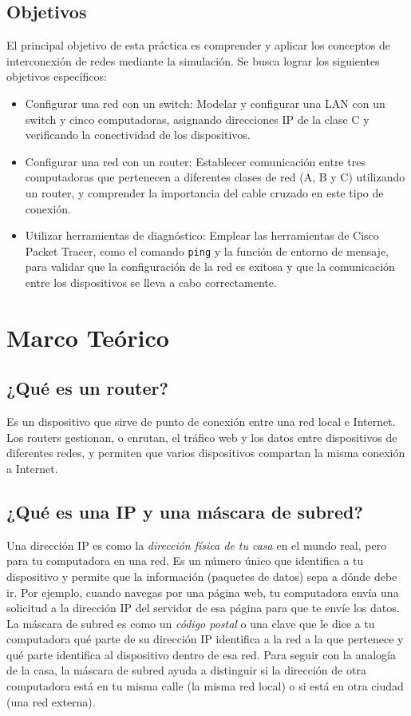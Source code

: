 \documentclass[letterpaper,12pt,oneside]{article}
\begin{document}
\subsection*{Objetivos}
El principal objetivo de esta práctica es comprender y aplicar los conceptos de interconexión de redes mediante la simulación. Se busca lograr los siguientes objetivos específicos:
\begin{itemize}
    \item Configurar una red con un switch: Modelar y configurar una LAN con un switch y cinco computadoras, asignando direcciones IP de la clase C y verificando la conectividad de los dispositivos.
    \item Configurar una red con un router: Establecer comunicación entre tres computadoras que pertenecen a diferentes clases de red (A, B y C) utilizando un router, y comprender la importancia del cable cruzado en este tipo de conexión.
    \item Utilizar herramientas de diagnóstico: Emplear las herramientas de Cisco Packet Tracer, como el comando \texttt{ping} y la función de entorno de mensaje, para validar que la configuración de la red es exitosa y que la comunicación entre los dispositivos se lleva a cabo correctamente.
\end{itemize}
\clearpage

\section{Marco Teórico}
\subsection*{¿Qué es un router?}
Es un dispositivo que sirve de punto de conexión entre una red local e Internet. Los routers gestionan, o enrutan, el tráfico web y los datos entre dispositivos de diferentes redes, y permiten que varios dispositivos compartan la misma conexión a Internet.

\subsection*{¿Qué es una IP y una máscara de subred?}
Una dirección IP es como la \textit{dirección física de tu casa} en el mundo real, pero para tu computadora en una red. Es un número único que identifica a tu dispositivo y permite que la información (paquetes de datos) sepa a dónde debe ir. Por ejemplo, cuando navegas por una página web, tu computadora envía una solicitud a la dirección IP del servidor de esa página para que te envíe los datos. La máscara de subred es como un \textit{código postal} o una clave que le dice a tu computadora qué parte de su dirección IP identifica a la red a la que pertenece y qué parte identifica al dispositivo dentro de esa red. Para seguir con la analogía de la casa, la máscara de subred ayuda a distinguir si la dirección de otra computadora está en tu misma calle (la misma red local) o si está en otra ciudad (una red externa).
\end{document}

